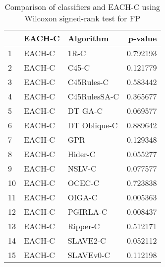 \begin{table}
\footnotesize
\caption{Comparison of classifiers and EACH-C using Wilcoxon signed-rank test for FP}
\label{tab:EACH-C wilcoxon FP comparison}
\begin{tabular}{lllr}
\hline
 & EACH-C & Algorithm & p-value \\
\hline
1 & EACH-C & 1R-C & 0.792193 \\
2 & EACH-C & C45-C & 0.121779 \\
3 & EACH-C & C45Rules-C & 0.583442 \\
4 & EACH-C & C45RulesSA-C & 0.365677 \\
5 & EACH-C & DT GA-C & 0.069577 \\
6 & EACH-C & DT Oblique-C & 0.889642 \\
7 & EACH-C & GPR & 0.129348 \\
8 & EACH-C & Hider-C & 0.055277 \\
9 & EACH-C & NSLV-C & 0.077577 \\
10 & EACH-C & OCEC-C & 0.723838 \\
11 & EACH-C & OIGA-C & 0.005363 \\
12 & EACH-C & PGIRLA-C & 0.008437 \\
13 & EACH-C & Ripper-C & 0.512171 \\
14 & EACH-C & SLAVE2-C & 0.052112 \\
15 & EACH-C & SLAVEv0-C & 0.112198 \\
\hline
\end{tabular}
\end{table}
